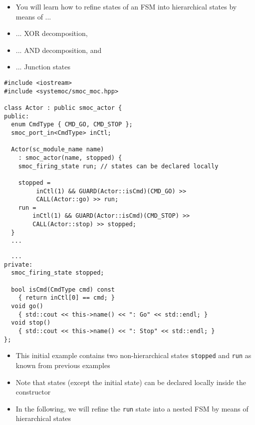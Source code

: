 \begin{frame}
\begin{itemize}
\item You will learn how to refine states of an FSM into hierarchical states by means of ...
\item ... XOR decomposition,
\item ... AND decomposition, and
\item ... Junction states
\end{itemize}
\end{frame}


\begin{frame}[fragile=singleslide]
\begin{lstlisting}
#include <iostream>
#include <systemoc/smoc_moc.hpp>

class Actor : public smoc_actor {
public:
  enum CmdType { CMD_GO, CMD_STOP };
  smoc_port_in<CmdType> inCtl;

  Actor(sc_module_name name)
    : smoc_actor(name, stopped) {
    smoc_firing_state run; // states can be declared locally

    stopped =
         inCtl(1) && GUARD(Actor::isCmd)(CMD_GO) >>
         CALL(Actor::go) >> run;
    run =
        inCtl(1) && GUARD(Actor::isCmd)(CMD_STOP) >>
        CALL(Actor::stop) >> stopped;
  }
  ...
\end{lstlisting}
\end{frame}

\begin{frame}[fragile=singleslide]
\begin{lstlisting}
  ...
private:
  smoc_firing_state stopped;

  bool isCmd(CmdType cmd) const
    { return inCtl[0] == cmd; }
  void go()
    { std::cout << this->name() << ": Go" << std::endl; }
  void stop()
    { std::cout << this->name() << ": Stop" << std::endl; }
};
\end{lstlisting}
\begin{itemize}
\item This initial example contains two non-hierarchical states \texttt{stopped} and \texttt{run} as known from previous examples
\item Note that states (except the initial state) can be declared locally inside the constructor
\item In the following, we will refine the \texttt{run} state into a nested FSM by means of hierarchical states
\end{itemize}
\end{frame}


